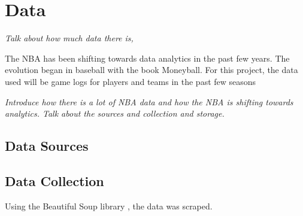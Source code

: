 \chapter{Data}\label{chapter:data}

\textit{Talk about how much data there is, }

The NBA has been shifting towards data analytics in the past few years.  The evolution began in baseball with the book Moneyball.  For this project, the data used will be game logs for players and teams in the past few seasons

\textit{Introduce how there is a lot of NBA data and how the NBA is shifting towards analytics.  Talk about the sources and collection and storage.}

\section{Data Sources}

\section{Data Collection}

Using the Beautiful Soup library \cite{beautifulsoup}, the data was scraped.